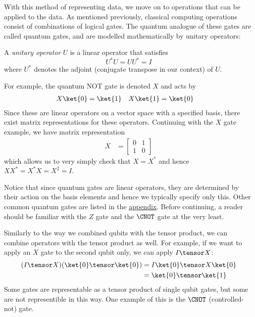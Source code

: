 \documentclass{article}
\begin{document}
        With this method of representing data, we move on to operations that can be applied to the data.
        As mentioned previously, classical computing operations consist of combinations of logical gates.
        The quantum analogue of these gates are called quantum gates, and are modelled mathematically by unitary operators:

        \begin{definition}
                A \textit{unitary operator} $U$ is a linear operator that satisfies
                        $$U^* U = UU^* = I$$
                where $U^*$ denotes the adjoint (conjugate transpose in our context) of $U$.
        \end{definition}

        For example, the quantum NOT gate is denoted $X$ and acts by
        \begin{align*}
                X \ket{0} &= \ket{1} & X \ket{1} &= \ket{0}
        \end{align*}
        Since these are linear operators on a vector space with a specified basis, there exist matrix representations for these operators.
        Continuing with the $X$ gate example, we have matrix representation
        \begin{align*}
        X &= \begin{bmatrix} 0 & 1 \\ 1 & 0 \end{bmatrix}
        \end{align*}
        which allows us to very simply check that $X = X^*$ and hence $XX^* = X^* X = X^2 = I$.

        Notice that since quantum gates are linear operators, they are determined by their action on the basis elements and hence we typically specify only this.
        Other common quantum gates are listed in the \hyperref[appendix:code]{appendix}.
        Before continuing, a reader should be familiar with the $Z$ gate and the $\CNOT$ gate at the very least.
        
        Similarly to the way we combined qubits with the tensor product, we can combine operators with the tensor product as well.
        For example, if we want to apply an $X$ gate to the second qubit only, we can apply $I \tensor X$:
        \begin{align*}
        (I \tensor X)(\ket{0} \tensor \ket{0}) &= I \ket{0} \tensor X \ket{0}\\
        &= \ket{0} \tensor \ket{1}
        \end{align*}
        Some gates are representable as a tensor product of single qubit gates, but some are not representible in this way.
        One example of this is the $\CNOT$ (controlled-not) gate.
\end{document}
